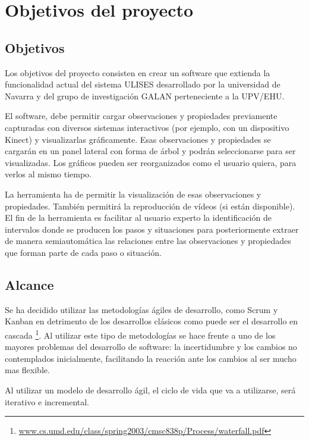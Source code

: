 \chapter{Objetivos del proyecto}


\section{Objetivos}
Los objetivos del proyecto consisten en crear un software que extienda la funcionalidad actual del sistema ULISES desarrollado 
por la universidad de Navarra y del grupo de investigación GALAN perteneciente a la UPV/EHU.

El software, debe permitir cargar observaciones y propiedades previamente capturadas con diversos
sistemas interactivos (por ejemplo, con un dispositivo Kinect) y
visualizarlas gr\'aficamente. Esas observaciones y propiedades se cargar\'an en un panel lateral con forma de \'arbol
y podr\'an seleccionarse para ser visualizadas. Los gr\'aficos pueden ser reorganizados como el
usuario quiera, para verlos al mismo tiempo.

La herramienta ha de permitir la visualizaci\'on de esas observaciones y propiedades. 
Tambi\'en permitir\'a la reproducci\'on de v\'ideos (si est\'an disponible).
El fin de la herramienta es
facilitar al usuario experto la identificaci\'on de intervalos donde se producen los
pasos y situaciones para posteriormente extraer de manera semiautom\'atica las relaciones entre las observaciones y
propiedades que forman parte de cada paso o situaci\'on.

\section{Alcance}
Se ha decidido utilizar las metodolog\'ias
\'agiles de desarrollo, como Scrum y Kanban en detrimento de los desarrollos cl\'asicos 
como puede ser el desarrollo en cascada  
\footnote{\url{www.cs.umd.edu/class/spring2003/cmsc838p/Process/waterfall.pdf}}.
Al utilizar este tipo de metodolog\'ias se hace frente a uno de los mayores problemas del 
desarrollo de software: la incertidumbre y los cambios
no contemplados inicialmente, facilitando la reacci\'on ante los cambios
al ser mucho mas flexible.

Al utilizar un modelo de desarrollo \'agil, el ciclo de vida que va a utilizarse, ser\'a iterativo e incremental.

